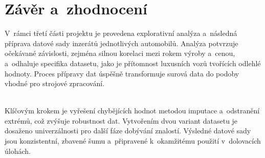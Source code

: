 \documentclass[a4paper, 11pt]{article}
\begin{document}
\section*{Závěr a~zhodnocení}

V~rámci třetí části projektu je provedena explorativní analýza a~následná příprava datové sady inzerátů jednotlivých automobilů.
Analýza potvrzuje očekávané závislosti, zejména silnou korelaci mezi rokem výroby a~cenou, a~odhaluje specifika datasetu, jako je přítomnost luxusních vozů tvořících odlehlé hodnoty.
Proces přípravy dat úspěšně transformuje surová data do podoby vhodné pro strojové zpracování.

\noindent \\ Klíčovým krokem je vyřešení chybějících hodnot metodou imputace a~odstranění extrémů, což zvýšuje robustnost dat.
Vytvořením dvou variant datasetu je dosaženo univerzálnosti pro další fáze dobývání znalostí.
Výsledné datové sady jsou konzistentní, zbavené šumu a~připravené k~okamžitému použití v~dolovacích úlohách.
\end{document}
